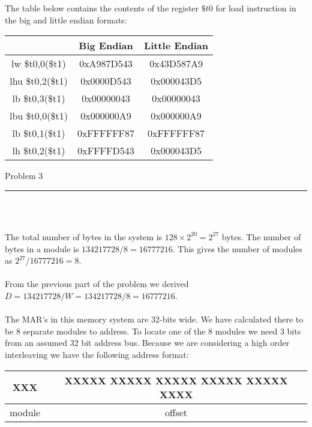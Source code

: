 \documentclass[11pt,reqno]{article}
\begin{document}
The table below contains the contents of the register $\$t0$ for load instruction in the big and little endian formats:\\

\begin{tabular}{| c | c | c |}
\hline
& Big Endian & Little Endian \\ \hline
lw \$t0,0(\$t1) & 0xA987D543 & 0x43D587A9 \\ \hline
lhu \$t0,2(\$t1) & 0x0000D543 & 0x000043D5 \\ \hline
lb \$t0,3(\$t1) & 0x00000043 & 0x00000043 \\ \hline
lbu \$t0,0(\$t1) & 0x000000A9 & 0x000000A9 \\ \hline
lb \$t0,1(\$t1) & 0xFFFFFF87 & 0xFFFFFF87 \\ \hline
lh \$t0,2(\$t1) & 0xFFFFD543 & 0x000043D5\\ \hline
\end{tabular}
\newpage

\begin{flushleft} 
Problem 3 \\
\rule{500pt}{1pt}\\
\end{flushleft} 

\noindent{}\\ 

The total number of bytes in the system is $128 \times 2^{20} = 2^{27}$ bytes. The number of bytes in a module is $134217728/8 = 16777216$. This gives the number of modules as $2^{27}/16777216 = 8$.\\

\noindent{}\\ 

From the previous part of the problem we derived $D = 134217728/W = 134217728/8 = 16777216$.\\

\noindent{}\\ 

The MAR's in this memory system are 32-bits wide. We have calculated there to be 8 separate modules to address. To locate one of the 8 modules we need 3 bits from an assumed 32 bit address bus. Because we are considering a high order interleaving we have the following address format:\\

\begin{tabular}{| c | c |}
\hline
XXX & XXXXX XXXXX XXXXX XXXXX XXXXX XXXX \\ \hline
module & offset \\ \hline
\end{tabular}\\
\end{document}
